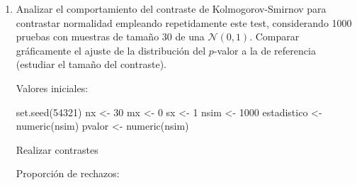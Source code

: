\documentclass[
]{book}
\newenvironment{Shaded}{\begin{snugshade}}{\end{snugshade}}
\newcommand{\ControlFlowTok}[1]{\textcolor[rgb]{0.13,0.29,0.53}{\textbf{#1}}}
\newcommand{\DecValTok}[1]{\textcolor[rgb]{0.00,0.00,0.81}{#1}}
\newcommand{\FunctionTok}[1]{\textcolor[rgb]{0.00,0.00,0.00}{#1}}
\newcommand{\NormalTok}[1]{#1}
\newcommand{\OtherTok}[1]{\textcolor[rgb]{0.56,0.35,0.01}{#1}}
\newcommand{\SpecialCharTok}[1]{\textcolor[rgb]{0.00,0.00,0.00}{#1}}
\newcommand{\StringTok}[1]{\textcolor[rgb]{0.31,0.60,0.02}{#1}}
\theoremstyle{break}
\theoremstyle{definition}
\theoremstyle{definition}
\theoremstyle{definition}
\theoremstyle{definition}
\theoremstyle{remark}
\begin{document}
\begin{enumerate}
\def\labelenumi{\alph{enumi})}
\item
  Analizar el comportamiento del contraste de Kolmogorov-Smirnov
  para contrastar normalidad empleando repetidamente este test,
  considerando 1000 pruebas con muestras de tamaño 30 de
  una \(\mathcal{N}(0,1)\). Comparar gráficamente el ajuste
  de la distribución del \(p\)-valor a la de referencia
  (estudiar el tamaño del contraste).

  Valores iniciales:

\begin{Shaded}
\begin{Highlighting}[]
\FunctionTok{set.seed}\NormalTok{(}\DecValTok{54321}\NormalTok{)}
\NormalTok{nx }\OtherTok{\textless{}{-}} \DecValTok{30}
\NormalTok{mx }\OtherTok{\textless{}{-}} \DecValTok{0}
\NormalTok{sx }\OtherTok{\textless{}{-}} \DecValTok{1}
\NormalTok{nsim }\OtherTok{\textless{}{-}} \DecValTok{1000}
\NormalTok{estadistico }\OtherTok{\textless{}{-}} \FunctionTok{numeric}\NormalTok{(nsim)}
\NormalTok{pvalor }\OtherTok{\textless{}{-}} \FunctionTok{numeric}\NormalTok{(nsim)}
\end{Highlighting}
\end{Shaded}

  Realizar contrastes

\begin{Shaded}
\end{Shaded}

  Proporción de rechazos:


\end{enumerate}
\end{document}

